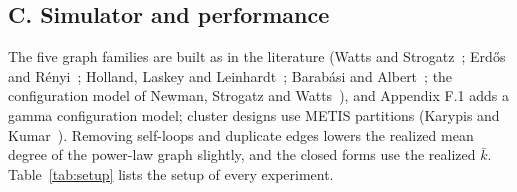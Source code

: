 \documentclass[final,5p,times,twocolumn,number]{elsarticle}
\begin{document}
\subsection*{C. Simulator and performance}

The five graph families are built as in the literature (Watts and Strogatz~\cite{r24}; Erdős and Rényi~\cite{r9}; Holland, Laskey and Leinhardt~\cite{r11}; Barabási and Albert~\cite{r2}; the configuration model of Newman, Strogatz and Watts~\cite{r19}), and Appendix F.1 adds a gamma configuration model; cluster designs use METIS partitions (Karypis and Kumar~\cite{r15}). Removing self-loops and duplicate edges lowers the realized mean degree of the power-law graph slightly, and the closed forms use the realized $\bar k$. Table~\ref{tab:setup} lists the setup of every experiment.
\end{document}
